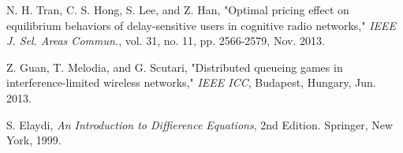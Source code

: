 \documentclass[journal]{IEEEtran}
\begin{document}
\begin{thebibliography}{1}
N. H. Tran, C. S. Hong, S. Lee, and Z. Han, "Optimal pricing
effect on equilibrium behaviors of delay-sensitive users in
cognitive radio networks," \emph{IEEE J. Sel. Areas Commun.}, vol.
31, no. 11, pp. 2566-2579, Nov. 2013.



Z. Guan, T. Melodia, and G. Scutari, "Distributed queueing games in
interference-limited wireless networks," \emph{IEEE ICC},
Budapest, Hungary, Jun. 2013.


S. Elaydi, \emph{An Introduction to Diffierence Equations}, 2nd Edition.
Springer, New York, 1999.




\end{thebibliography}
\end{document}
